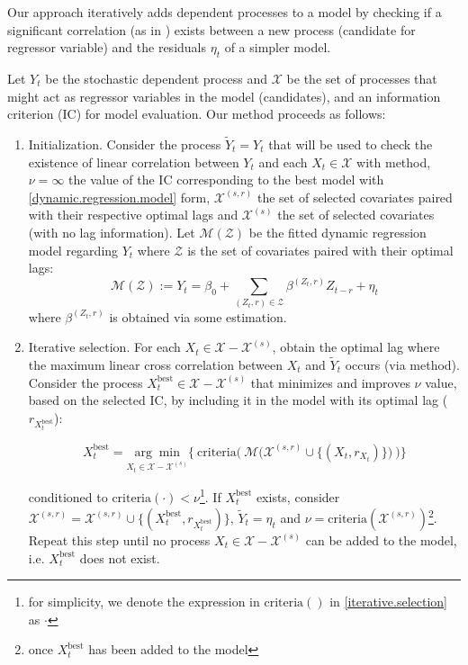 \documentclass[twoside]{article}
\begin{document}
Our approach iteratively adds dependent processes to a model by checking if a significant correlation (as in \cite{cryer2008time}) exists between a new process (candidate for regressor variable) and the residuals $\eta_t$ of a simpler model.

Let $Y_t$ be the stochastic dependent process and $\mathcal{X}$ be the set of processes that might act as regressor variables in the model (candidates), and an information criterion (IC) for model evaluation. Our method proceeds as follows:


\begin{enumerate}
    \item Initialization. Consider the process $\tilde{Y}_t=Y_t$ that will be used to check the existence of linear correlation between $Y_t$ and each $X_t\in \mathcal{X}$ with \cite{cryer2008time} method, $\nu=\infty$ the value of the IC corresponding to the best model with \ref{dynamic.regression.model} form, $\mathcal{X}^{(s,r)}$ the set of selected covariates paired with their respective optimal lags and $\mathcal{X}^{(s)}$ the set of selected covariates (with no lag information). Let $\mathcal{M}(\mathcal{Z})$ be the fitted dynamic regression model regarding $Y_t$ where $\mathcal{Z}$ is the set of covariates paired with their optimal lags:
    \[ \mathcal{M}(\mathcal{Z}) := Y_t = \beta_0 + \sum_{(Z_t, r)\in\mathcal{Z}} \beta^{(Z_t, r)} Z_{t-r} + \eta_t\]
    \noindent where $\beta^{(Z_t, r)}$ is obtained via some estimation.

    \item Iterative selection. For each $X_t\in\mathcal{X}-\mathcal{X}^{(s)}$, obtain the optimal lag where the maximum linear cross correlation between $X_t$ and $\tilde{Y}_t$ occurs (via \cite{cryer2008time} method). Consider the process $X_t^\text{best}\in\mathcal{X}-\mathcal{X}^{(s)}$ that minimizes and improves $\nu$ value, based on the selected IC, by including it in the model with its optimal lag ($r_{X_t^\text{best}}$):
    
    \begin{equation}\label{iterative.selection}
        X^\text{best}_t =  \underset{X_t\in\mathcal{X}-\mathcal{X}^{(s)}}{\arg\min} \Bigg\{ \ \text{criteria}\Bigg(\ \mathcal{M}\Big(\mathcal{X}^{(s,r)} \cup \big\{(X_t, r_{X_t})\big\} \Big) \ \Bigg) \Bigg\}
    \end{equation}

    \noindent conditioned to $\text{criteria}(\cdot) < \nu$\footnote{for simplicity, we denote the expression in $\text{criteria}()$ in \ref{iterative.selection} as $\cdot$}. 
    If $X^{\text{best}}_t$ exists, consider $\mathcal{X}^{(s,r)} = \mathcal{X}^{(s,r)}  \cup \{(X_t^\text{best}, r_{X_t^\text{best}})\}$, $\tilde{Y}_t = \eta_t$ and $\nu=\text{criteria}(\mathcal{X}^{(s,r)})$\footnote{once $X_t^\text{best}$ has been added to the model }. Repeat this step until no process $X_t\in\mathcal{X}-\mathcal{X}^{(s)}$ can be added to the model, i.e. $X_t^\text{best}$ does not exist.


\end{enumerate}
\end{document}
